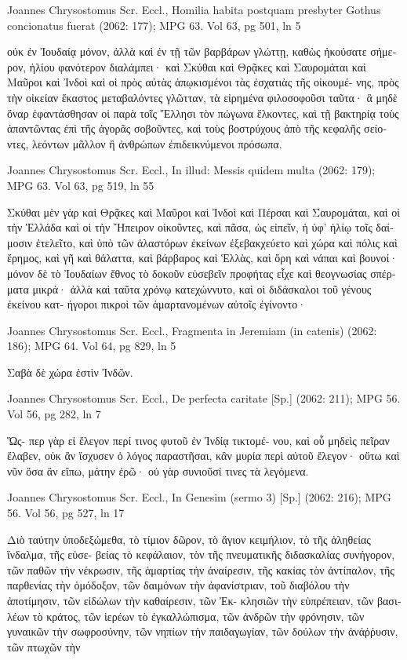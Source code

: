 \documentclass[12pt,letterpaper,twoside,final]{memoir}
\begin{document}
\begin{greek}
Joannes Chrysostomus Scr. Eccl., Homilia habita postquam presbyter Gothus concionatus fuerat (2062: 177); MPG 63.
Vol 63, pg 501, ln 5

                                                     οὐκ ἐν 
Ἰουδαίᾳ μόνον, ἀλλὰ καὶ ἐν τῇ τῶν βαρβάρων γλώττῃ, 
καθὼς ἠκούσατε σήμερον, ἡλίου φανότερον διαλάμπει· καὶ 
Σκύθαι καὶ Θρᾷκες καὶ Σαυρομάται καὶ Μαῦροι καὶ Ἰνδοὶ 
καὶ οἱ πρὸς αὐτὰς ἀπῳκισμένοι τὰς ἐσχατιὰς τῆς οἰκουμέ-
νης, πρὸς τὴν οἰκείαν ἕκαστος μεταβαλόντες γλῶτταν, τὰ 
εἰρημένα φιλοσοφοῦσι ταῦτα· ἃ μηδὲ ὄναρ ἐφαντάσθησαν 
οἱ παρὰ τοῖς Ἕλλησι τὸν πώγωνα ἕλκοντες, καὶ 
τῇ βακτηρίᾳ τοὺς ἀπαντῶντας ἐπὶ τῆς ἀγορᾶς σοβοῦντες, 
καὶ τοὺς βοστρύχους ἀπὸ τῆς κεφαλῆς σείοντες, λεόντων 
μᾶλλον ἢ ἀνθρώπων ἐπιδεικνύμενοι πρόσωπα. 



Joannes Chrysostomus Scr. Eccl., In illud: Messis quidem multa (2062: 179); MPG 63.
Vol 63, pg 519, ln 55

                           Σκύθαι μὲν γὰρ καὶ Θρᾷκες 
καὶ Μαῦροι καὶ Ἰνδοὶ καὶ Πέρσαι καὶ Σαυρομάται, καὶ 
οἱ τὴν Ἑλλάδα καὶ οἱ τὴν Ἤπειρον οἰκοῦντες, καὶ πᾶσα, 
ὡς εἰπεῖν, ἡ ὑφ' ἡλίῳ τοῖς δαίμοσιν ἐτελεῖτο, καὶ ὑπὸ 
τῶν ἀλαστόρων ἐκείνων ἐξεβακχεύετο καὶ χώρα καὶ 
πόλις καὶ ἔρημος, καὶ γῆ καὶ θάλαττα, καὶ βάρβαρος 
καὶ Ἑλλὰς, καὶ ὄρη καὶ νάπαι καὶ βουνοί· μόνον δὲ τὸ 
Ἰουδαίων ἔθνος τὸ δοκοῦν εὐσεβεῖν προφήτας εἶχε    
καὶ θεογνωσίας σπέρματα μικρά· ἀλλὰ καὶ ταῦτα χρόνῳ 
κατεχώννυτο, καὶ οἱ διδάσκαλοι τοῦ γένους ἐκείνου κατ-
ήγοροι πικροὶ τῶν ἁμαρτανομένων αὐτοῖς ἐγίνοντο· 




Joannes Chrysostomus Scr. Eccl., Fragmenta in Jeremiam (in catenis) (2062: 186); MPG 64.
Vol 64, pg 829, ln 5

         Σαβὰ δὲ χώρα ἐστὶν Ἰνδῶν. 



Joannes Chrysostomus Scr. Eccl., De perfecta caritate [Sp.] (2062: 211); MPG 56.
Vol 56, pg 282, ln 7

                                                        Ὥς-
περ γὰρ εἰ ἔλεγον περί τινος φυτοῦ ἐν Ἰνδίᾳ τικτομέ-
νου, καὶ οὗ μηδεὶς πεῖραν ἔλαβεν, οὐκ ἂν ἴσχυσεν ὁ 
λόγος παραστῆσαι, κἂν μυρία περὶ αὐτοῦ ἔλεγον· οὕτω 
καὶ νῦν ὅσα ἂν εἴπω, μάτην ἐρῶ· οὐ γὰρ συνιοῦσί τινες 
τὰ λεγόμενα. 



Joannes Chrysostomus Scr. Eccl., In Genesim (sermo 3) [Sp.] (2062: 216); MPG 56.
Vol 56, pg 527, ln 17

            Διὸ ταύτην ὑποδεξώμεθα, τὸ τίμιον δῶρον, 
τὸ ἅγιον κειμήλιον, τὸ τῆς ἀληθείας ἴνδαλμα, τῆς εὐσε-
βείας τὸ κεφάλαιον, τὸν τῆς πνευματικῆς διδασκαλίας 
συνήγορον, τῶν παθῶν τὴν νέκρωσιν, τῆς ἁμαρτίας τὴν 
ἀναίρεσιν, τῆς κακίας τὸν ἀντίπαλον, τῆς παρθενίας τὴν 
ὁμόδοξον, τῶν δαιμόνων τὴν ἀφανίστριαν, τοῦ διαβόλου 
τὴν ἀποτίμησιν, τῶν εἰδώλων τὴν καθαίρεσιν, τῶν Ἐκ-
κλησιῶν τὴν εὐπρέπειαν, τῶν βασιλέων τὸ κράτος, τῶν 
ἱερέων τὸ ἐγκαλλώπισμα, τῶν ἀνδρῶν τὴν φρόνησιν, τῶν 
γυναικῶν τὴν σωφροσύνην, τῶν νηπίων τὴν παιδαγωγίαν, 
τῶν δούλων τὴν ἀνάῤῥυσιν, τῶν πτωχῶν τὴν


\end{greek}
\end{document}
